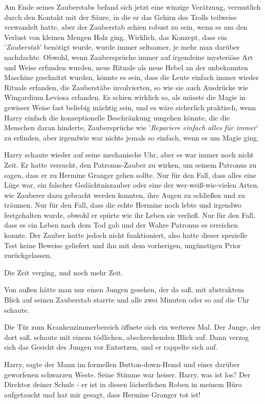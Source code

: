 Am Ende seines Zauberstabs befand sich jetzt eine winzige Verätzung, vermutlich
durch den Kontakt mit der Säure, in die er das Gehirn des Trolls teilweise
verwandelt hatte, aber der Zauberstab schien robust zu sein, wenn es um den
Verlust von kleinen Mengen Holz ging. Wirklich, das Konzept, dass ein
'\emph{Zauberstab}' benötigt wurde, wurde immer seltsamer, je mehr man darüber
nachdachte. Obwohl, wenn Zaubersprüche immer auf irgendeine mysteriöse Art und
Weise erfunden wurden, neue Rituale als neue Hebel an der unbekannten Maschine
geschnitzt wurden, könnte es sein, dass die Leute einfach immer wieder Rituale
erfanden, die Zauberstäbe involvierten, so wie sie auch Ausdrücke wie \glqq{}
Wingardium Leviosa\grqq{} erfanden. Es schien wirklich so, als müsste die Magie
in gewisser Weise fast beliebig mächtig sein, und es wäre sicherlich praktisch,
wenn Harry einfach die konzeptionelle Beschränkung umgehen könnte, die die
Menschen daran hinderte, Zaubersprüche wie '\emph{Repariere einfach alles für
immer}' zu erfinden, aber irgendwie war nichts jemals so einfach, wenn es um
Magie ging.

Harry schaute wieder auf seine mechanische Uhr, aber es war immer noch nicht
Zeit. Er hatte versucht, den Patronus-Zauber zu wirken, um seinem Patronus zu
sagen, dass er zu Hermine Granger gehen sollte. Nur für den Fall, dass alles
eine Lüge war, ein falscher Gedächtniszauber oder eine der wer-weiß-wie-vielen
Arten, wie Zauberer dazu gebracht werden konnten, ihre Augen zu schließen und zu
träumen. Nur für den Fall, dass die echte Hermine noch lebte und irgendwo
festgehalten wurde, obwohl er spürte wie ihr Leben sie verließ. Nur für den
Fall, dass es ein Leben nach dem Tod gab und der Wahre Patronus es erreichen
konnte. Der Zauber hatte jedoch nicht funktioniert, also hatte dieser spezielle
Test keine Beweise geliefert und ihn mit dem vorherigen, ungünstigen Prior
zurückgelassen.

Die Zeit verging, und noch mehr Zeit.

Von außen hätte man nur einen Jungen gesehen, der da saß, mit abstraktem Blick
auf seinen Zauberstab starrte und alle zwei Minuten oder so auf die Uhr schaute.

Die Tür zum Krankenzimmerbereich öffnete sich ein weiteres Mal. Der Junge, der
dort saß, schaute mit einem tödlichen, abschreckenden Blick auf. Dann verzog
sich das Gesicht des Jungen vor Entsetzen, und er rappelte sich auf.

\glqq{}Harry\grqq{}, sagte der Mann im formellen Button-down-Hemd und einer
darüber geworfenen schwarzen Weste. Seine Stimme war heiser. \glqq{}Harry, was
ist los? Der Direktor deiner Schule - er ist in diesen lächerlichen Roben in
meinem Büro aufgetaucht und hat mir gesagt, dass Hermine Granger tot ist!\grqq{}


